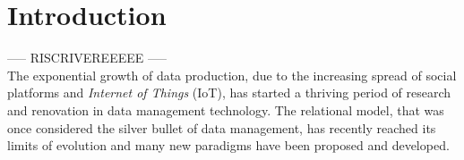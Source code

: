 \chapter*{Introduction}


----- RISCRIVEREEEEE -----\\
The exponential growth of data production, due to the increasing spread of social platforms and \emph{Internet of Things} (IoT), has started a thriving period of research and renovation in data management technology.
The relational model, that was once considered the silver bullet of data management, has recently reached its limits of evolution and many new paradigms have been proposed and developed.


